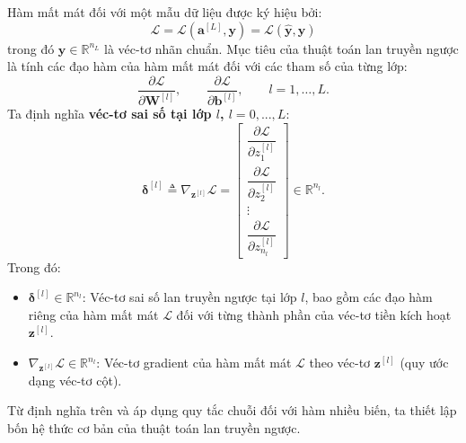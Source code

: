 Hàm mất mát đối với một mẫu dữ liệu được ký hiệu bởi:
\begin{equation}
\mathcal{L} 
= \mathcal{L}\!\left(\mathbf{a}^{[L]},\mathbf{y}\right)
= \mathcal{L}\!\left(\hat{\mathbf{y}},\mathbf{y}\right)
\end{equation}
trong đó $\mathbf{y} \in \mathbb{R}^{n_L}$ là véc-tơ nhãn chuẩn. Mục tiêu của thuật toán lan truyền ngược là tính các đạo hàm của hàm mất mát đối với các tham số của từng lớp:
\begin{equation}
\frac{\partial\mathcal{L}}{\partial\mathbf{W}^{[l]}}, \qquad \frac{\partial\mathcal{L}}{\partial\mathbf{b}^{[l]}}, \qquad l=1,\dots,L.
\end{equation}
Ta định nghĩa \textbf{véc-tơ sai số tại lớp $l$, $l=0,...,L$}:
\begin{equation}
    \boldsymbol{\delta}^{[l]} \triangleq \nabla_{\mathbf{z}^{[l]}}\mathcal{L} = 
    \begin{bmatrix}
    \dfrac{\partial\mathcal{L}}{\partial z_1^{[l]}} \\[6pt]
    \dfrac{\partial\mathcal{L}}{\partial z_2^{[l]}} \\
    \vdots \\
    \dfrac{\partial\mathcal{L}}{\partial z_{n_l}^{[l]}}
    \end{bmatrix}
    \in \mathbb{R}^{n_l}.
\end{equation}
Trong đó:
\begin{itemize}
    \item $\boldsymbol{\delta}^{[l]} \in \mathbb{R}^{n_l}$: Véc-tơ sai số lan truyền ngược tại lớp $l$, bao gồm các đạo hàm riêng của hàm mất mát $\mathcal{L}$ đối với từng thành phần của véc-tơ tiền kích hoạt $\mathbf{z}^{[l]}$.
    \item $\nabla_{\mathbf{z}^{[l]}}\mathcal{L} \in \mathbb{R}^{n_l}$: Véc-tơ gradient của hàm mất mát $\mathcal{L}$ theo véc-tơ $\mathbf{z}^{[l]}$ (quy ước dạng véc-tơ cột).
\end{itemize}
Từ định nghĩa trên và áp dụng quy tắc chuỗi đối với hàm nhiều biến, ta thiết lập bốn hệ thức cơ bản của thuật toán lan truyền ngược.
